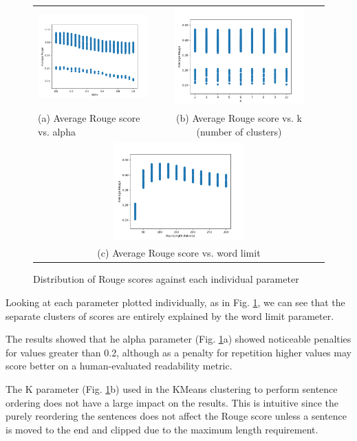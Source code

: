 \documentclass{article}
\begin{document}
    \begin{figure}
        \begin{tabular}{lc}
             \includegraphics[width=50mm]{fig/alpha.png} &   \includegraphics[width=50mm]{fig/k.png} \\
            (a) Average Rouge score vs. alpha  & (b) Average Rouge score vs. k (number of clusters) \\[10pt]
            \multicolumn{2}{c}{\includegraphics[width=50mm]{fig/wordcount.png} }\\
            \multicolumn{2}{c}{(c) Average Rouge score vs. word limit}
        \end{tabular}
        \caption{Distribution of Rouge scores against each individual parameter}\label{fig:ind_plots}
    \end{figure}

    Looking at each parameter plotted individually, as in Fig. \ref{fig:ind_plots}, we can see that the separate clusters of scores are entirely explained by the word limit parameter.

    The results showed that he alpha parameter (Fig. \ref{fig:ind_plots}a) showed noticeable penalties for values greater than 0.2, although as a penalty for repetition higher values may score better on a human-evaluated readability metric.

    The K parameter (Fig. \ref{fig:ind_plots}b) used in the KMeans clustering to perform sentence ordering does not have a large impact on the results.
    This is intuitive since the purely reordering the sentences does not affect the Rouge score unless a sentence is moved to the end and clipped due to the maximum length requirement.
\end{document}
